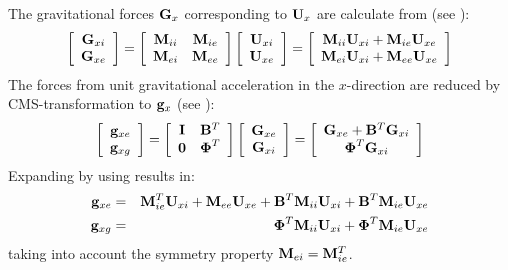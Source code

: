 {The gravitational forces ${\bf G}_x$ corresponding to ${\bf U}_x$ are calculate
from (see ):
%
\begin{equation}
\left[\begin{array}{cc}
{\bf G}_{xi} \\ {\bf G}_{xe}
\end{array}\right] =
\left[\begin{array}{cc}
{\bf M}_{ii} & {\bf M}_{ie} \\
{\bf M}_{ei} & {\bf M}_{ee}
\end{array}\right]
\left[\begin{array}{cc}
{\bf U}_{xi} \\ {\bf U}_{xe} \\
\end{array} \right] =
\left[\begin{array}{cc}
{\bf M}_{ii}{\bf U}_{xi} + {\bf M}_{ie}{\bf U}_{xe} \\
{\bf M}_{ei}{\bf U}_{xi} + {\bf M}_{ee}{\bf U}_{xe}
\end{array}\right]
\label{eqK35:1}
\end{equation}
%
The forces from unit gravitational acceleration in the $x$-direction are reduced
by CMS-transformation to ${\bf g}_x$ (see ):
%
\begin{equation}
\left[\begin{array}{cc}
{\bf g}_{xe} \\ {\bf g}_{xg}
\end{array}\right]  =
\left[\begin{array}{cc}
{\bf I} & {\bf B}^T \\
{\bf 0} & {\boldsymbol{\Phi}}^T
\end{array}\right]
\left[\begin{array}{cc}
{\bf G}_{xe} \\ {\bf G}_{xi}
\end{array}\right] =
\left[\begin{array}{cc}
{\bf G}_{xe} + {\bf B}^T {\bf G}_{xi} \\
{\boldsymbol{\Phi}}^T {\bf G}_{xi}
\end{array}\right]
\label{eqK35:2}
\end{equation}
%
Expanding by using  results in:
%
\begin{eqnarray}
{\mf g}_{xe} &=&  {\mf M}_{ie}^T {\mf U}_{xi} +
{\mf M}_{ee} {\mf U}_{xe} + {\mf B}^T {\mf M}_{ii}{\mf U}_{xi} +
{\mf B}^T  {\mf M}_{ie} {\mf U}_{xe}
\label{eqK35:3} \\
%
{\mf g}_{xg} &=& {\bs\Phi}^T {\mf M}_{ii}{\mf U}_{xi} +
{\bs\Phi}^T {\mf M}_{ie}{\mf U}_{xe}
\label{eqK35:5}
\end{eqnarray}
%
taking into account the symmetry property ${\bf M}_{ei} = {\bf M}_{ie}^T$.

}
